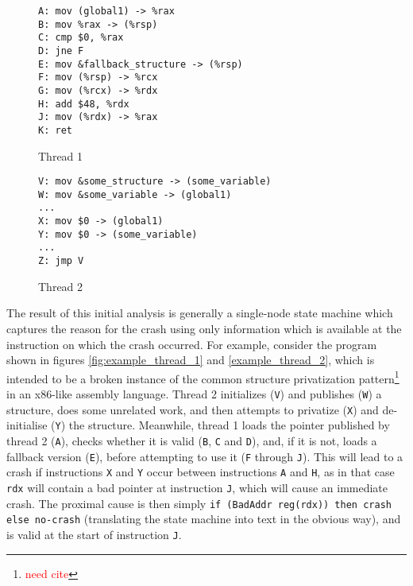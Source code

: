 \documentclass[10pt,twocolumn,preprint,natbib,authoryear]{sigplanconf}
\makeatletter
\newcommand{\editorial}[1]{\textcolor{red}{\footnote{\textcolor{red}{#1}}}}
\newcommand{\needCite}{\editorial{need cite}}
\newenvironment{subfloat}%
    {\def\caption##1{\gdef\subcapsave{\relax##1}}%
     \let\subcapsave=\@empty %
     \let\sf@oldlabel=\label
     \def\label##1{\xdef\sublabsave{\noexpand\label{##1}}}%
     \let\sublabsave\relax    %
     \setbox\subfigbox\hbox
       \bgroup}%
      {\egroup                %
     \let\label=\sf@oldlabel
     \subfigure[\subcapsave]{\box\subfigbox}}%
\makeatother
\begin{document}
\begin{figure*}
 \begin{subfloat}
  \begin{minipage}{90mm}
\begin{verbatim}
A: mov (global1) -> %rax
B: mov %rax -> (%rsp)
C: cmp $0, %rax
D: jne F
E: mov &fallback_structure -> (%rsp)
F: mov (%rsp) -> %rcx
G: mov (%rcx) -> %rdx
H: add $48, %rdx
J: mov (%rdx) -> %rax
K: ret
\end{verbatim}
  \end{minipage}
  \caption{Thread 1}
 \end{subfloat}
 \begin{subfloat}
  \begin{minipage}{90mm}
\begin{verbatim}
V: mov &some_structure -> (some_variable)
W: mov &some_variable -> (global1)
...
X: mov $0 -> (global1)
Y: mov $0 -> (some_variable)
...
Z: jmp V
\end{verbatim}
  \end{minipage}
  \caption{Thread 2}
 \end{subfloat}
 \caption{A broken example of the privatize synchronization pattern.}
 \label{fig:broken_privatize}
\end{figure*}

The result of this initial analysis is generally a single-node state
machine which captures the reason for the crash using only information
which is available at the instruction on which the crash occurred.
For example, consider the program shown in figures
\ref{fig:example_thread_1} and \ref{example_thread_2}, which is
intended to be a broken instance of the common structure privatization
pattern\needCite{} in an x86-like assembly language.  Thread 2
initializes (\verb|V|) and publishes (\verb|W|) a structure, does some
unrelated work, and then attempts to privatize (\verb|X|) and
de-initialise (\verb|Y|) the structure.  Meanwhile, thread 1 loads the
pointer published by thread 2 (\verb|A|), checks whether it is valid
(\verb|B|, \verb|C| and \verb|D|), and, if it is not, loads a fallback
version (\verb|E|), before attempting to use it (\verb|F| through
\verb|J|).  This will lead to a crash if instructions \verb|X| and
\verb|Y| occur between instructions \verb|A| and \verb|H|, as in that
case \verb|rdx| will contain a bad pointer at instruction \verb|J|,
which will cause an immediate crash.  The proximal cause is then
simply \verb|if (BadAddr reg(rdx)) then crash else no-crash|
(translating the state machine into text in the obvious way), and is
valid at the start of instruction \verb|J|.
\end{document}
